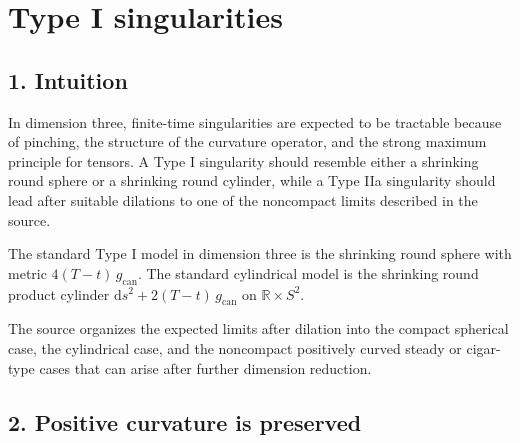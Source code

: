 \chapter{Type I singularities}

\section*{1. Intuition}

\begin{remark}
\label{ch09-rem-singularity-intuition}

In dimension three, finite-time singularities are expected to be tractable because of pinching, the structure of the curvature operator, and the strong maximum principle for tensors. A Type I singularity should resemble either a shrinking round sphere or a shrinking round cylinder, while a Type IIa singularity should lead after suitable dilations to one of the noncompact limits described in the source.
\end{remark}

\begin{remark}
\label{ch09-rem-canonical-model-geometries}

The standard Type I model in dimension three is the shrinking round sphere with metric \(4(T-t)\,g_{\mathrm{can}}\). The standard cylindrical model is the shrinking round product cylinder \(\mathrm{d}s^2+2(T-t)\,g_{\mathrm{can}}\) on \(\mathbb{R}\times S^2\).
\end{remark}

\begin{remark}
\label{ch09-rem-singularity-model-heuristics}

The source organizes the expected limits after dilation into the compact spherical case, the cylindrical case, and the noncompact positively curved steady or cigar-type cases that can arise after further dimension reduction.
\end{remark}

\section*{2. Positive curvature is preserved}

